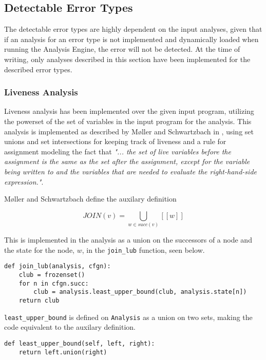 \subsection{Detectable Error Types}

The detectable error types are highly dependent on the input analyses, given that if an analysis for an error type is not implemented and dynamically loaded when running the Analysis Engine, the error will not be detected. At the time of writing, only analyses described in this section have been implemented for the described error types. 

\subsubsection{Liveness Analysis}
Liveness analysis has been implemented over the given input program, utilizing the powerset of the set of variables in the input program for the analysis. 
This analysis is implemented as described by Møller and Schwartzbach in \cite{spa}, using set unions and set intersections for keeping track of liveness and a rule for assignment modeling the fact that \textit{"... the set of live variables before the assignment is the same as the set after the assignment, except for the variable being written to and the variables that are needed to evaluate the right-hand-side expression."}. 

\newpar Møller and Schwartzbach define the auxilary definition

\begin{equation}
    J O I N (v) = \mathop{{\bigcup}}_{w \in succ(v)} [[w]]
\end{equation}

\noindent This is implemented in the analysis as a union on the successors of a node and the state for the node, $w$, in the \texttt{join\_lub} function, seen below. 

\begin{verbatim}
def join_lub(analysis, cfgn):
    club = frozenset()
    for n in cfgn.succ:
        club = analysis.least_upper_bound(club, analysis.state[n])
    return club
\end{verbatim}

\noindent \texttt{least\_upper\_bound} is defined on \texttt{Analysis} as a union on two sets, making the code equivalent to the auxilary definition. 

\begin{verbatim}
def least_upper_bound(self, left, right):
    return left.union(right)
\end{verbatim}


